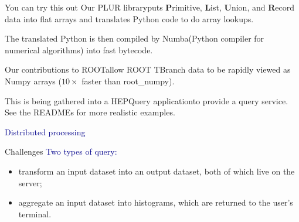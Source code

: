 \documentclass{beamer}
\begin{document}
\begin{frame}{You can try this out}
Our PLUR library\footnotemark[1] puts {\bf P}rimitive, {\bf L}ist, {\bf U}nion, and {\bf R}ecord data into flat arrays and translates Python code to do array lookups.

\vspace{0.5 cm}
The translated Python is then compiled by Numba\footnotemark[2] (Python compiler for numerical algorithms) into fast bytecode.

\vspace{0.5 cm}
Our contributions to ROOT\footnotemark[3] allow ROOT TBranch data to be rapidly viewed as Numpy arrays ($10\times$ faster than root\_numpy).

\vspace{0.5 cm}
This is being gathered into a HEPQuery application\footnotemark[4] to provide a query service. See the READMEs for more realistic examples.

\end{frame}

\begin{frame}
\begin{center}
\huge \textcolor{darkblue}{Distributed processing}
\end{center}
\end{frame}

\begin{frame}{Challenges}
\vspace{0.5 cm}
\textcolor{darkblue}{Two types of query:}
\begin{itemize}
\item transform an input dataset into an output dataset, both of which live on the server;
\item aggregate an input dataset into histograms, which are returned to the user's terminal.
\end{itemize}

\vspace{0.5 cm}

\vspace{0.5 cm}

\vspace{0.5 cm}
\end{frame}
\end{document}
